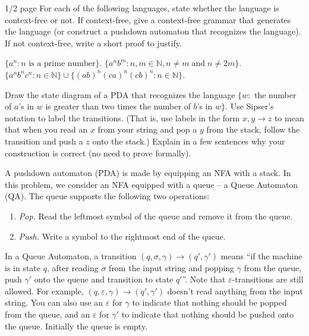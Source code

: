 \documentclass[solution, letterpaper]{cscie121}
\begin{document}


 {1/2 page}
For each of the following languages, state whether the language is context-free or not. If context-free, give a context-free grammar that generates the language (or construct a pushdown automaton that recognizes the language). If not context-free, write a short proof to justify.

\subproblem $\{a^{n} : n \text{ is a prime number}\}$. 
\subproblem $\{a^nb^m : n,m\in \mathbb{N},  n \neq m\; \textrm{and}\; n \neq 2m\}$.
\subproblem
$\{a^{n}b^{n}c^{n} : n\in\mathbb{N}\} \cup \{(ab)^n(ca)^n(cb)^n : n\in\mathbb{N}\}$. 

\begin{solution}
\end{solution}


Draw the state diagram of a PDA that recognizes the language $\{w :$ the number
of $a$'s in $w$ is greater than two times the number of $b$'s in $w\}$. Use
Sipser's notation to label the transitions. (That is, use labels in the form
$x,y\to z$ to mean that when you read an $x$ from your string and pop a $y$
from the stack, follow the transition and push a $z$ onto the stack.) Explain
in a few sentences why your construction is correct (no need to prove
formally).

\begin{solution}
\end{solution}


A pushdown automaton (PDA) is made by equipping an NFA with a stack. In this
problem, we consider an NFA equipped with a queue -- a Queue Automaton (QA).
The queue supports the following two operations:
\begin{enumerate}
  \item {\em Pop.} Read the leftmost symbol of the queue and remove it from
    the queue.
  \item {\em Push.} Write a symbol to the rightmost end of the queue.
\end{enumerate}

In a Queue Automaton, a transition $(q, \sigma, \gamma)\rightarrow (q',
\gamma')$ means ``if the machine is in state $q$, after reading $\sigma$ from
the input string and popping $\gamma$ from the queue, push
$\gamma'$ onto the queue and transition to state $q'$''. Note that
$\varepsilon$-transitions are still allowed. For example, $(q, \varepsilon,
\gamma)\rightarrow (q', \gamma')$ doesn't read anything from the input string.
You can also use an $\varepsilon$ for $\gamma$ to indicate that nothing should
be popped from the queue, and an $\varepsilon$ for $\gamma'$ to indicate that
nothing should be pushed onto the queue. Initially the queue is empty.
\end{document}
